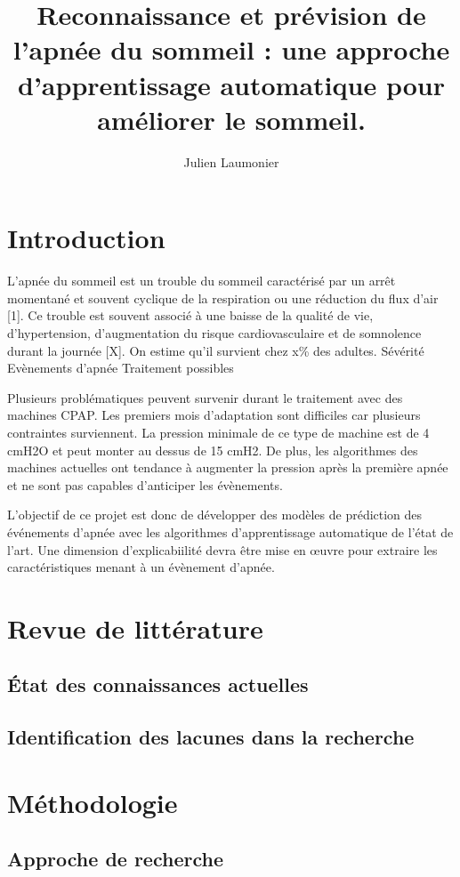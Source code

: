 \documentclass{article}
\title{Reconnaissance et prévision de l'apnée du sommeil : une approche d'apprentissage automatique pour améliorer le sommeil. }
\author{Julien Laumonier}
\begin{document}
    \maketitle

    \section{Introduction}

    L’apnée du sommeil est un trouble du sommeil caractérisé par un arrêt momentané et souvent cyclique de la respiration ou une réduction du flux d’air [1]. Ce trouble est souvent associé à une baisse de la qualité de vie, d'hypertension, d’augmentation du risque cardiovasculaire et de somnolence durant la journée [X]. On estime qu’il survient chez x\% des adultes.
    Sévérité
    Evènements d’apnée
    Traitement possibles

    Plusieurs problématiques peuvent survenir durant le traitement avec des machines CPAP. Les premiers mois d’adaptation sont difficiles car plusieurs contraintes surviennent. La pression minimale de ce type de machine est de 4 cmH2O et peut monter au dessus de 15 cmH2. De plus, les algorithmes des machines actuelles ont tendance à augmenter la pression après la première apnée et ne sont pas capables d’anticiper les évènements.

    L’objectif de ce projet est donc de développer des modèles de prédiction des événements d’apnée avec les algorithmes d’apprentissage automatique de l’état de l’art. Une dimension d’explicabiilité devra être mise en œuvre pour extraire les caractéristiques menant à un évènement d’apnée.

    \section{Revue de littérature}
    \subsection{État des connaissances actuelles}
    \subsection{Identification des lacunes dans la recherche}

    \section{ Méthodologie}
    \subsection{Approche de recherche}
\end{document}
